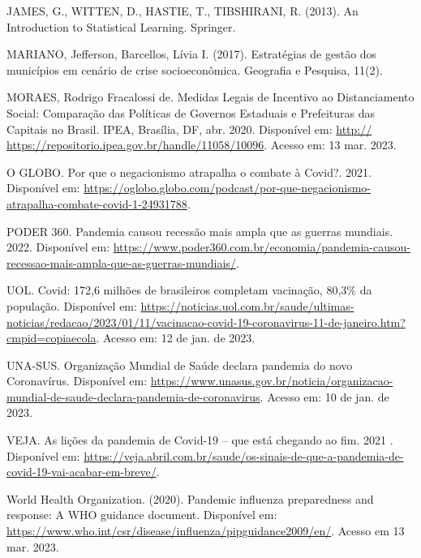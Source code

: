 \documentclass[
]{article}
\begin{document}
JAMES, G., WITTEN, D., HASTIE, T., TIBSHIRANI, R. (2013). An
Introduction to Statistical Learning. Springer.

MARIANO, Jefferson, Barcellos, Lívia I. (2017). Estratégias de gestão
dos municípios em cenário de crise socioeconômica. Geografia e Pesquisa,
11(2).

MORAES, Rodrigo Fracalossi de. Medidas Legais de Incentivo ao
Distanciamento Social: Comparação das Políticas de Governos Estaduais e
Prefeituras das Capitais no Brasil. IPEA, Brasília, DF, abr. 2020.
Disponível em: \url{http://}
\url{https://repositorio.ipea.gov.br/handle/11058/10096}. Acesso em: 13
mar. 2023.

O GLOBO. Por que o negacionismo atrapalha o combate à Covid?. 2021.
Disponível em:
\url{https://oglobo.globo.com/podcast/por-que-negacionismo-atrapalha-combate-covid-1-24931788}.

PODER 360. Pandemia causou recessão mais ampla que as guerras mundiais.
2022. Disponível em:
\url{https://www.poder360.com.br/economia/pandemia-causou-recessao-mais-ampla-que-as-guerras-mundiais/}.

UOL. Covid: 172,6 milhões de brasileiros completam vacinação, 80,3\% da
população. Disponível em:
\url{https://noticias.uol.com.br/saude/ultimas-noticias/redacao/2023/01/11/vacinacao-covid-19-coronavirus-11-de-janeiro.htm?cmpid=copiaecola}.
Acesso em: 12 de jan. de 2023.

UNA-SUS. Organização Mundial de Saúde declara pandemia do novo
Coronavírus. Disponível em:
\url{https://www.unasus.gov.br/noticia/organizacao-mundial-de-saude-declara-pandemia-de-coronavirus}.
Acesso em: 10 de jan. de 2023.

VEJA. As lições da pandemia de Covid-19 -- que está chegando ao fim.
2021 . Disponível em:
\url{https://veja.abril.com.br/saude/os-sinais-de-que-a-pandemia-de-covid-19-vai-acabar-em-breve/}.

World Health Organization. (2020). Pandemic influenza preparedness and
response: A WHO guidance document. Disponível em:
\url{https://www.who.int/csr/disease/influenza/pipguidance2009/en/}.
Acesso em 13 mar. 2023.
\end{document}
